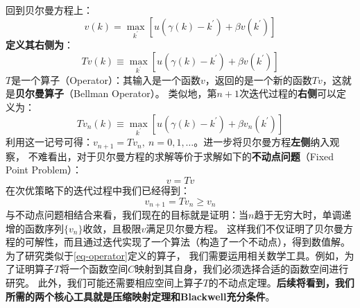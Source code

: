 回到贝尔曼方程上：
\begin{equation*}
    v\left(k\right)=\max _{k^{\prime}}\left[u\left(\gamma\left(k\right)-k^{\prime}\right)+\beta v\left(k^{\prime}\right)\right]
\end{equation*}
\textbf{定义其右侧为}：
\begin{equation}    \label{eq-operator}
    Tv\left(k\right) \equiv \max _{k^{\prime}} 
        \left[u\left(\gamma\left(k\right)-k^{\prime}\right)+\beta v\left(k^{\prime}\right)\right]
\end{equation}
$T$是一个算子（Operator）：其输入是一个函数$v$，返回的是一个新的函数$Tv$，这就是\textbf{贝尔曼算子}（Bellman Operator）。
类似地，第$n+1$次迭代过程的\textbf{右侧}可以定义为：
\begin{equation*}
    Tv_n\left(k\right) \equiv 
        \max _{k^{\prime}} \left[u\left(\gamma\left(k\right)-k^{\prime}\right)+\beta v_n\left(k^{\prime}\right)\right]
\end{equation*}
利用这一记号可得：$v_{n+1}=Tv_n, ~ n=0,1,\dots$。进一步将贝尔曼方程\textbf{左侧}纳入观察，
不难看出，对于贝尔曼方程的求解等价于求解如下的\textbf{不动点问题}（Fixed Point Problem）：
\begin{equation*}
    v = Tv
\end{equation*}
在次优策略下的迭代过程中我们已经得到：
\begin{equation*}
    v_{n+1}=Tv_n \geq v_n
\end{equation*}
与不动点问题相结合来看，我们现在的目标就是证明：当$n$趋于无穷大时，单调递增的函数序列$\{v_n\}$收敛，且极限$v$满足贝尔曼方程。
这样我们不仅证明了贝尔曼方程的可解性，而且通过迭代实现了一个算法（构造了一个不动点），得到数值解。
为了研究类似于\cref{eq-operator}定义的算子，
我们需要运用相关数学工具。例如，为了证明算子$T$将一个函数空间$C$映射到其自身，我们必须选择合适的函数空间进行研究。
此外，我们可能还需要相应空间上算子$T$的不动点定理。\textbf{后续将看到，我们所需的两个核心工具就是压缩映射定理和Blackwell充分条件}。